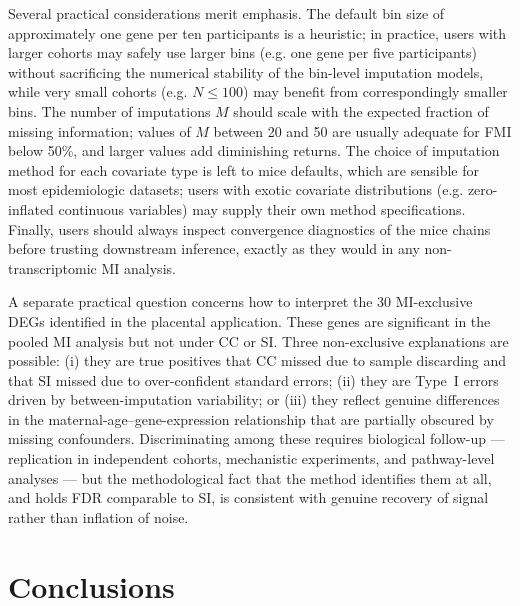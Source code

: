 \documentclass[11pt]{article}
\begin{document}
Several practical considerations merit emphasis. The default bin size of approximately one gene per ten participants is a heuristic; in practice, users with larger cohorts may safely use larger bins (e.g. one gene per five participants) without sacrificing the numerical stability of the bin-level imputation models, while very small cohorts (e.g. $N \leq 100$) may benefit from correspondingly smaller bins. The number of imputations $M$ should scale with the expected fraction of missing information; values of $M$ between 20 and 50 are usually adequate for FMI below 50\%, and larger values add diminishing returns. The choice of imputation method for each covariate type is left to mice defaults, which are sensible for most epidemiologic datasets; users with exotic covariate distributions (e.g. zero-inflated continuous variables) may supply their own method specifications. Finally, users should always inspect convergence diagnostics of the mice chains before trusting downstream inference, exactly as they would in any non-transcriptomic MI analysis.

A separate practical question concerns how to interpret the 30 MI-exclusive DEGs identified in the placental application. These genes are significant in the pooled MI analysis but not under CC or SI. Three non-exclusive explanations are possible: (i) they are true positives that CC missed due to sample discarding and that SI missed due to over-confident standard errors; (ii) they are Type~I errors driven by between-imputation variability; or (iii) they reflect genuine differences in the maternal-age--gene-expression relationship that are partially obscured by missing confounders. Discriminating among these requires biological follow-up --- replication in independent cohorts, mechanistic experiments, and pathway-level analyses --- but the methodological fact that the method identifies them at all, and holds FDR comparable to SI, is consistent with genuine recovery of signal rather than inflation of noise.

\section{Conclusions}
\end{document}
